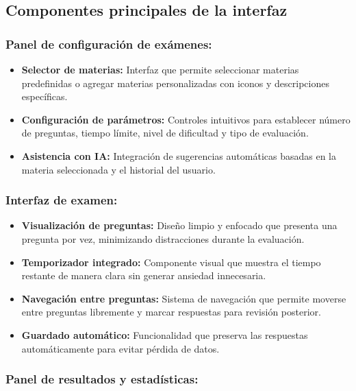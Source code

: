 \documentclass[12pt,a4paper]{report}
\begin{document}
\subsection{Componentes principales de la interfaz}

\subsubsection{Panel de configuración de exámenes:}

\begin{itemize}
\item \textbf{Selector de materias:} Interfaz que permite seleccionar materias predefinidas o agregar materias personalizadas con iconos y descripciones específicas.

\item \textbf{Configuración de parámetros:} Controles intuitivos para establecer número de preguntas, tiempo límite, nivel de dificultad y tipo de evaluación.

\item \textbf{Asistencia con IA:} Integración de sugerencias automáticas basadas en la materia seleccionada y el historial del usuario.
\end{itemize}

\subsubsection{Interfaz de examen:}

\begin{itemize}
\item \textbf{Visualización de preguntas:} Diseño limpio y enfocado que presenta una pregunta por vez, minimizando distracciones durante la evaluación.

\item \textbf{Temporizador integrado:} Componente visual que muestra el tiempo restante de manera clara sin generar ansiedad innecesaria.

\item \textbf{Navegación entre preguntas:} Sistema de navegación que permite moverse entre preguntas libremente y marcar respuestas para revisión posterior.

\item \textbf{Guardado automático:} Funcionalidad que preserva las respuestas automáticamente para evitar pérdida de datos.
\end{itemize}

\subsubsection{Panel de resultados y estadísticas:}
\end{document}
